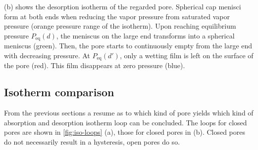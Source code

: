 \documentclass[../thesis.tex]{subfiles}
\begin{document}
                 (b) shows the desorption isotherm of the regarded pore. Spherical cap menisci form at both ends when reducing the vapor pressure from saturated vapor pressure (orange pressure range of the isotherm). Upon reaching equilibrium pressure $P_\mathrm{eq}(d)$, the meniscus on the large end transforms into a spherical meniscus (green). Then, the pore starts to continuously empty from the large end with decreasing pressure. At $P_\mathrm{eq}(d')$, only a wetting film is left on the surface of the pore (red). This film disappears at zero pressure (blue).

            

        \subsection{Isotherm comparison}
        \label{subsec:isotherm-comparison}

            From the previous sections a resume as to which kind of pore yields which kind of absorption and desorption isotherm loop can be concluded. The loops for closed pores are  shown in \cref{fig:iso-loops} (a),  those for closed pores in (b). Closed pores do not necessarily result in a hysteresis, open pores do so.
\end{document}
